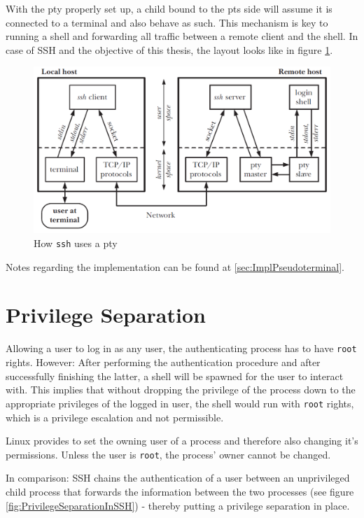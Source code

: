 \documentclass[10pt,a4paper,titlepage,twoside,english,final]{zhawreprt}
\begin{document}
With the \gls{pty} properly set up, a child bound to the \gls{pts} side will assume it is connected to a \gls{terminal} and also behave as such.
This mechanism is key to running a \gls{shell} and forwarding all traffic between a remote client and the \gls{shell}.
In case of \gls{SSH} and the objective of this thesis, the layout looks like in figure \ref{fig:HowSSHUsesPty}.
\begin{figure}[ht]
\includegraphics[width=\textwidth]{PseudoterminalSSH}
\caption{How \texttt{ssh} uses a \gls{pty}\citep[p.1378]{KerriskTLPI}}
\label{fig:HowSSHUsesPty}
\end{figure}

Notes regarding the implementation can be found at \ref{sec:ImplPseudoterminal}.


\newpage
\section{Privilege Separation}\label{sec:DesignPrivilegeSeparation}
Allowing a user to log in as any user, the authenticating process has to have \texttt{root} rights.
However: After performing the authentication procedure and after successfully finishing the latter, a \gls{shell} will be spawned for the user to interact with.
This implies that without dropping the privilege of the process down to the appropriate privileges of the logged in user, the \gls{shell} would run with \texttt{root} rights, which is a privilege escalation and not permissible.

\gls{Linux} provides \cite{setuid} to set the owning user of a process and therefore also changing it's permissions.
Unless the user is \texttt{root}, the process' owner cannot be changed.

In comparison: \gls{SSH} chains the authentication of a user between an unprivileged child process that forwards the information between the two processes (see figure \ref{fig:PrivilegeSeparationInSSH}) - thereby putting a privilege separation in place.
\end{document}
